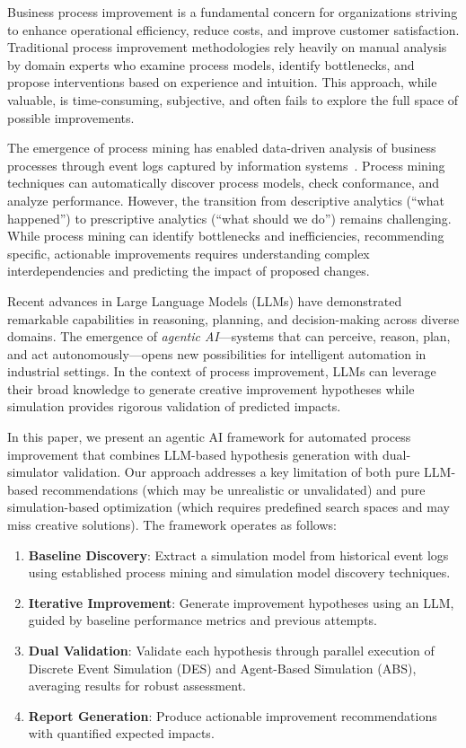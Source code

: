 \documentclass[preprint,12pt]{elsarticle}
\begin{document}
Business process improvement is a fundamental concern for organizations striving to enhance operational efficiency, reduce costs, and improve customer satisfaction. Traditional process improvement methodologies rely heavily on manual analysis by domain experts who examine process models, identify bottlenecks, and propose interventions based on experience and intuition. This approach, while valuable, is time-consuming, subjective, and often fails to explore the full space of possible improvements.

The emergence of process mining has enabled data-driven analysis of business processes through event logs captured by information systems~\cite{van2016process}. Process mining techniques can automatically discover process models, check conformance, and analyze performance. However, the transition from descriptive analytics (``what happened'') to prescriptive analytics (``what should we do'') remains challenging. While process mining can identify bottlenecks and inefficiencies, recommending specific, actionable improvements requires understanding complex interdependencies and predicting the impact of proposed changes.

Recent advances in Large Language Models (LLMs) have demonstrated remarkable capabilities in reasoning, planning, and decision-making across diverse domains. The emergence of \textit{agentic AI}---systems that can perceive, reason, plan, and act autonomously---opens new possibilities for intelligent automation in industrial settings. In the context of process improvement, LLMs can leverage their broad knowledge to generate creative improvement hypotheses while simulation provides rigorous validation of predicted impacts.

In this paper, we present an agentic AI framework for automated process improvement that combines LLM-based hypothesis generation with dual-simulator validation. Our approach addresses a key limitation of both pure LLM-based recommendations (which may be unrealistic or unvalidated) and pure simulation-based optimization (which requires predefined search spaces and may miss creative solutions). The framework operates as follows:

\begin{enumerate}
    \item \textbf{Baseline Discovery}: Extract a simulation model from historical event logs using established process mining and simulation model discovery techniques.
    \item \textbf{Iterative Improvement}: Generate improvement hypotheses using an LLM, guided by baseline performance metrics and previous attempts.
    \item \textbf{Dual Validation}: Validate each hypothesis through parallel execution of Discrete Event Simulation (DES) and Agent-Based Simulation (ABS), averaging results for robust assessment.
    \item \textbf{Report Generation}: Produce actionable improvement recommendations with quantified expected impacts.
\end{enumerate}
\end{document}
